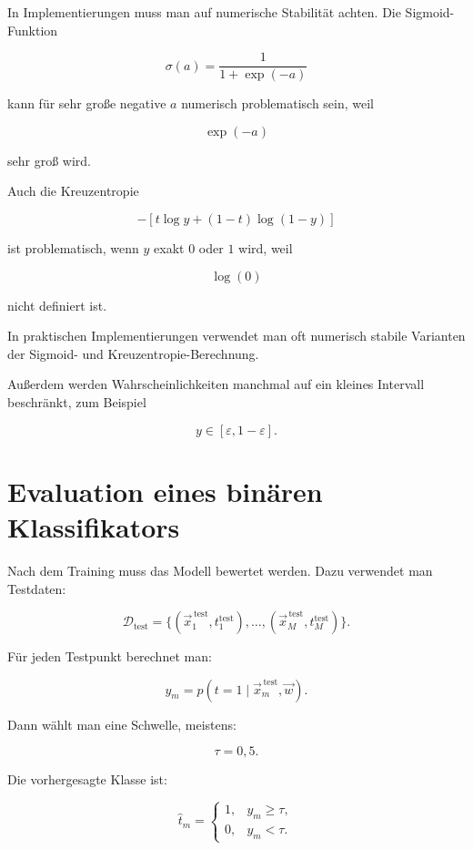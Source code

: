 In Implementierungen muss man auf numerische Stabilität achten.
Die Sigmoid-Funktion

\[
    \sigma(a)
    =
    \frac{1}{1+\exp(-a)}
\]

kann für sehr große negative \(a\) numerisch problematisch sein, weil

\[
    \exp(-a)
\]

sehr groß wird.

Auch die Kreuzentropie

\[
    -\left[
        t\log y
        +
        (1-t)\log(1-y)
    \right]
\]

ist problematisch, wenn \(y\) exakt \(0\) oder \(1\) wird, weil

\[
    \log(0)
\]

nicht definiert ist.

\begin{notebox}
In praktischen Implementierungen verwendet man oft numerisch stabile Varianten der Sigmoid- und Kreuzentropie-Berechnung.

Außerdem werden Wahrscheinlichkeiten manchmal auf ein kleines Intervall beschränkt, zum Beispiel

\[
    y \in [\varepsilon,1-\varepsilon].
\]
\end{notebox}

\section{Evaluation eines binären Klassifikators}

Nach dem Training muss das Modell bewertet werden.
Dazu verwendet man Testdaten:

\[
    \mathcal{D}_{\mathrm{test}}
    =
    \{(\vec{x}_1^{\,\mathrm{test}},t_1^{\mathrm{test}}),\dots,(\vec{x}_M^{\,\mathrm{test}},t_M^{\mathrm{test}})\}.
\]

Für jeden Testpunkt berechnet man:

\[
    y_m
    =
    p(t=1\mid\vec{x}_m^{\,\mathrm{test}},\vec{w}).
\]

Dann wählt man eine Schwelle, meistens:

\[
    \tau = 0{,}5.
\]

Die vorhergesagte Klasse ist:

\[
    \hat{t}_m
    =
    \begin{cases}
        1, & y_m \geq \tau, \\
        0, & y_m < \tau.
    \end{cases}
\]

